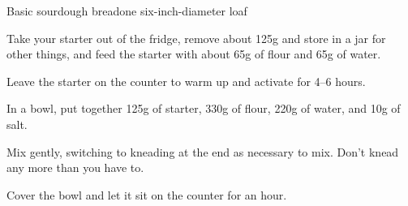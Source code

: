 \documentclass{article}
\begin{document}
  \begin{recipe}{Basic sourdough bread}{one six-inch-diameter loaf}
    \begin{step}
      \begin{ingrs}
      \end{ingrs}
      \begin{stepdesc}
        Take your starter out of the fridge, remove about 125g and store in a jar for other things, and feed the starter with about 65g of flour and 65g of water.
      \end{stepdesc}
    \end{step}
    \begin{step}
      \begin{ingrs}
      \end{ingrs}
      \begin{stepdesc}
        Leave the starter on the counter to warm up and activate for 4--6 hours.
      \end{stepdesc}
    \end{step}
    \begin{step}
      \begin{ingrs}
      \end{ingrs}
      \begin{stepdesc}
        In a bowl, put together 125g of starter, 330g of flour, 220g of water, and 10g of salt.
      \end{stepdesc}
    \end{step}
    \begin{step}
      \begin{ingrs}
      \end{ingrs}
      \begin{stepdesc}
        Mix gently, switching to kneading at the end as necessary to mix. Don't knead any more than you have to.
      \end{stepdesc}
    \end{step}
    \begin{step}
      \begin{ingrs}
      \end{ingrs}
      \begin{stepdesc}
        Cover the bowl and let it sit on the counter for an hour.
      \end{stepdesc}

\end{step}
\end{recipe}
\end{document}
